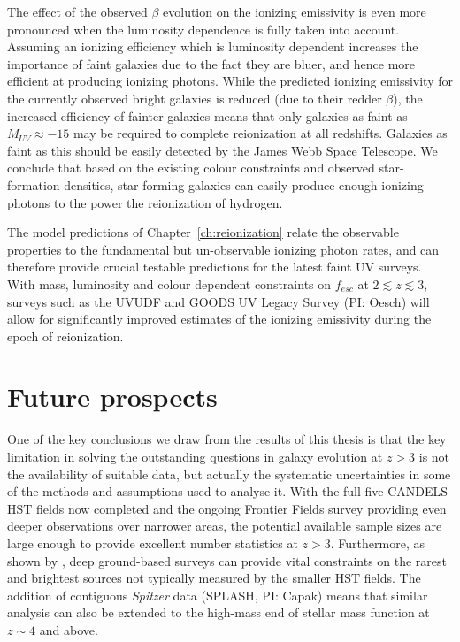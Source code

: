 The effect of the observed $\beta$ evolution on the ionizing emissivity is even more pronounced when the luminosity dependence is fully taken into account. Assuming an ionizing efficiency which is luminosity dependent increases the importance of faint galaxies due to the fact they are bluer, and hence more efficient at producing ionizing photons. While the predicted ionizing emissivity for the currently observed bright galaxies is reduced (due to their redder $\beta$), the increased efficiency of fainter galaxies means that only galaxies as faint as $M_{UV} \approx -15$ may be required to complete reionization at all redshifts. Galaxies as faint as this should be easily detected by the James Webb Space Telescope. We conclude that based on the existing colour constraints and observed star-formation densities, star-forming galaxies can easily produce enough ionizing photons to the power the reionization of hydrogen.

The model predictions of Chapter~\ref{ch:reionization} relate the observable properties to the fundamental but un-observable ionizing photon rates, and can therefore provide crucial testable predictions for the latest faint UV surveys. With mass, luminosity and colour dependent constraints on $f_{esc}$ at $2 \lesssim z \lesssim 3$, surveys such as the UVUDF \citep{Teplitz:2013jg} and GOODS UV Legacy Survey (PI: Oesch) will allow for significantly improved estimates of the ionizing emissivity during the epoch of reionization.

\section{Future prospects}\label{sec:conc-future}
One of the key conclusions we draw from the results of this thesis is that the key limitation in solving the outstanding questions in galaxy evolution at $z > 3$ is not the availability of suitable data, but actually the systematic uncertainties in some of the methods and assumptions used to analyse it. With the full five CANDELS HST fields now completed and the ongoing Frontier Fields survey providing even deeper observations over narrower areas, the potential available sample sizes are large enough to provide excellent number statistics at $z>3$. Furthermore, as shown by \citet{Bowler:vl,Bowler:2013wz}, deep ground-based surveys can provide vital constraints on the rarest and brightest sources not typically measured by the smaller HST fields. The addition of contiguous \emph{Spitzer} data (SPLASH, PI: Capak) means that similar analysis can also be extended to the high-mass end of stellar mass function at $z\sim 4$ and above.

